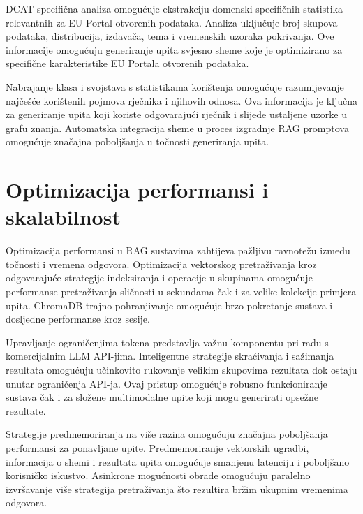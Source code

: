 DCAT-specifična analiza omogućuje ekstrakciju domenski specifičnih statistika relevantnih za EU Portal otvorenih podataka. Analiza uključuje broj skupova podataka, distribucija, izdavača, tema i vremenskih uzoraka pokrivanja. Ove informacije omogućuju generiranje upita svjesno sheme koje je optimizirano za specifične karakteristike EU Portala otvorenih podataka.

Nabrajanje klasa i svojstava s statistikama korištenja omogućuje razumijevanje najčešće korištenih pojmova rječnika i njihovih odnosa. Ova informacija je ključna za generiranje upita koji koriste odgovarajući rječnik i slijede ustaljene uzorke u grafu znanja. Automatska integracija sheme u proces izgradnje RAG promptova omogućuje značajna poboljšanja u točnosti generiranja upita.

\section{Optimizacija performansi i skalabilnost}
\label{sec:performance}

Optimizacija performansi u RAG sustavima zahtijeva pažljivu ravnotežu između točnosti i vremena odgovora. Optimizacija vektorskog pretraživanja kroz odgovarajuće strategije indeksiranja i operacije u skupinama omogućuje performanse pretraživanja sličnosti u sekundama čak i za velike kolekcije primjera upita. ChromaDB trajno pohranjivanje omogućuje brzo pokretanje sustava i dosljedne performanse kroz sesije.

Upravljanje ograničenjima tokena predstavlja važnu komponentu pri radu s komercijalnim LLM API-jima. Inteligentne strategije skraćivanja i sažimanja rezultata omogućuju učinkovito rukovanje velikim skupovima rezultata dok ostaju unutar ograničenja API-ja. Ovaj pristup omogućuje robusno funkcioniranje sustava čak i za složene multimodalne upite koji mogu generirati opsežne rezultate.

Strategije predmemoriranja na više razina omogućuju značajna poboljšanja performansi za ponavljane upite. Predmemoriranje vektorskih ugradbi, informacija o shemi i rezultata upita omogućuje smanjenu latenciju i poboljšano korisničko iskustvo. Asinkrone mogućnosti obrade omogućuju paralelno izvršavanje više strategija pretraživanja što rezultira bržim ukupnim vremenima odgovora. 